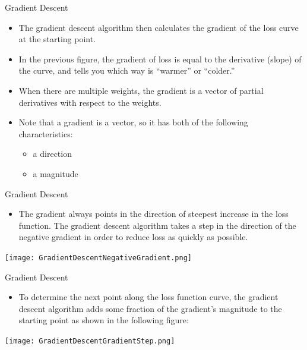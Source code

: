 \documentclass{beamer}
\begin{document}
\begin{frame}{Gradient Descent}
\begin{itemize}
    \item The gradient descent algorithm then calculates the gradient of the loss curve at the starting point. 
    
    \item In the previous figure, the gradient of loss is equal to the derivative (slope) of the curve, and tells you which way is ``warmer'' or ``colder.'' 
    
    \item When there are multiple weights, the gradient is a vector of partial derivatives with respect to the weights.
    
    \item Note that a gradient is a vector, so it has both of the following characteristics:
    \begin{itemize}
        \item a direction
        \item a magnitude
    \end{itemize}
\end{itemize}
\end{frame}

\begin{frame}{Gradient Descent}
\begin{itemize}
    \item The gradient always points in the direction of steepest increase in the loss function. The gradient descent algorithm takes a step in the direction of the negative gradient in order to reduce loss as quickly as possible.
\end{itemize}
\texttt{[image: GradientDescentNegativeGradient.png]}
\end{frame}

\begin{frame}{Gradient Descent}
\begin{itemize}
    \item To determine the next point along the loss function curve, the gradient descent algorithm adds some fraction of the gradient's magnitude to the starting point as shown in the following figure:
\end{itemize}
\texttt{[image: GradientDescentGradientStep.png]}
\end{frame}
\end{document}
